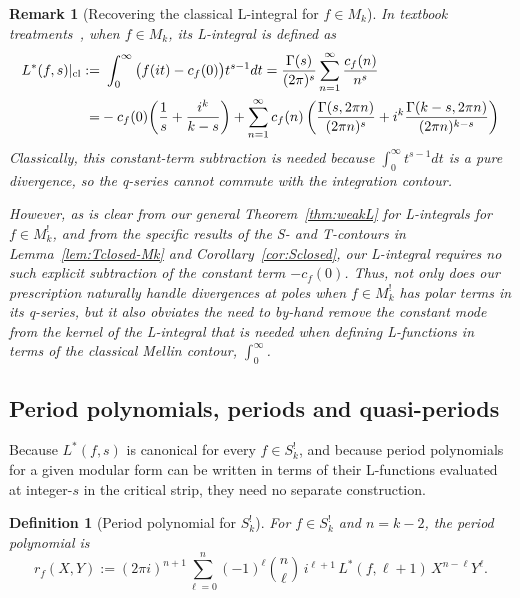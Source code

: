 \documentclass[11pt]{article}
\newtheorem{definition}[theorem]{Definition}
\newtheorem{remark}[theorem]{Remark}
\begin{document}
\begin{remark}[Recovering the classical L-integral for $f \in M_k$]\label{natural-beauty-via-finiteness}
\emph{In textbook treatments~\cite{01-Apostol}, when $f \in M_k$, its L-integral is defined as}
\begin{align}
L^*(f,s)|_{\rm cl} :=&~ \int_0^\infty \big( f(it) - c_f(0) \big) t^{s-1} dt = \frac{\Gamma(s)}{(2 \pi)^s} \sum_{n = 1}^{\infty} \frac{c_f(n)}{n^s} \\
=& -c_f(0) \bigg(\frac{1}{s} + \frac{i^k}{k-s} \bigg) + \sum_{n = 1}^{\infty} c_f(n)\left(\frac{\Gamma(s,2\pi n)}{(2\pi n)^s} + i^k \frac{\Gamma(k-s, 2\pi n)}{(2\pi n)^{k-s}}\right) \nonumber
\end{align}
\emph{Classically, this constant-term subtraction is needed because $\int_0^\infty t^{s-1} dt$ is a pure 
divergence, so the q-series cannot commute with the integration contour.}

\emph{However, as is clear from our general Theorem~\ref{thm:weakL} for L-integrals for $f \in M_k^!$, 
and from the specific results of the S- and T-contours in Lemma~\ref{lem:Tclosed-Mk} and 
Corollary~\ref{cor:Sclosed}, our L-integral requires no such explicit subtraction of the constant 
term $-c_f(0)$. Thus, not only does our prescription naturally handle divergences at poles when 
$f \in M_k^!$ has polar terms in its q-series, but it also obviates the need to by-hand remove the 
constant mode from the kernel of the L-integral that is needed when defining L-functions in terms 
of the classical Mellin contour, $\int_0^\infty$.}
\end{remark}

\subsection{Period polynomials, periods and quasi-periods}

Because $L^*(f,s)$ is canonical for every $f\in S^!_k$, and because period polynomials 
for a given modular form can be written in terms of their L-functions evaluated at integer-$s$ 
in the critical strip, they need no separate construction.

\begin{definition}[Period polynomial for $S_k^!$]\label{def:rf}
For $f\in S^!_k$ and $n=k-2$, the \emph{period polynomial} is
\begin{equation}
r_f(X,Y):=(2\pi i)^{n+1}\sum_{\ell=0}^{n}(-1)^\ell\binom{n}{\ell}\,i^{\ell+1}\,L^*(f,\ell+1)\,X^{n-\ell}Y^\ell.
\end{equation}
\end{definition}
\end{document}

